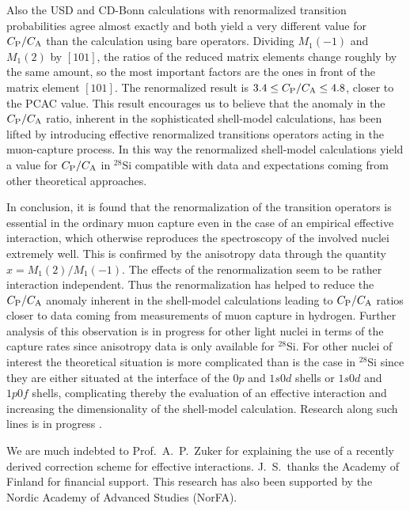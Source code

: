 \begin{multicols}{2}
Also the USD and CD-Bonn calculations with renormalized transition
probabilities agree almost exactly and both yield a very different value for
$C_{\rm P}/C_{\rm A}$ than the calculation using bare operators.
Dividing $M_1(-1)$ and $M_1(2)$ by $[101]$, the ratios of the reduced matrix
elements change roughly
by the same amount, so the most important factors are the ones in front of
the matrix element $[101]$.
The renormalized result is $3.4\le C_{\rm P}/C_{\rm A}\le 4.8$,
closer to the PCAC value.
This result
encourages us to believe that the anomaly in the $C_{\rm P}/C_{\rm A}$ ratio,
inherent in the sophisticated shell-model calculations, has been lifted
by introducing effective renormalized transitions operators acting in
the muon-capture process. In this way the renormalized shell-model
calculations yield a value for $C_{\rm P}/C_{\rm A}$ in $^{28}$Si
compatible with data and expectations coming from other theoretical
approaches.

In conclusion, it is found that the renormalization of the transition
operators is essential in the ordinary muon capture
even in the case of an empirical effective interaction, which otherwise
reproduces the spectroscopy of the involved nuclei extremely well. This is
confirmed by the anisotropy data
through the quantity $x=M_1(2)/M_1(-1)$. The effects of the renormalization
seem to be rather interaction independent. Thus the renormalization has helped
to reduce the $C_{\rm P}/C_{\rm A}$ anomaly inherent in the shell-model
calculations leading to $C_{\rm P}/C_{\rm A}$ ratios closer to data coming
from measurements of muon capture in hydrogen.
Further analysis of this observation is in progress for other light
nuclei in terms of the capture rates since anisotropy data is only
available for $^{28}$Si. For other nuclei of interest the
theoretical situation is more complicated than is the case in
$^{28}$Si since they are either situated at the interface of the $0p$ and
$1s0d$ shells or $1s0d$ and $1p0f$ shells, complicating thereby the evaluation
of an effective interaction and increasing the dimensionality
of the shell-model calculation. Research along such lines is
in progress \cite{ssh98}.\newline

We are much indebted to Prof.\
A.\ P.\ Zuker for explaining the use of a recently derived
correction scheme for effective interactions.
J.\ S.\ thanks the Academy of
Finland for financial support.
This research has also been supported by
the Nordic Academy of Advanced Studies (NorFA).


\end{multicols}
